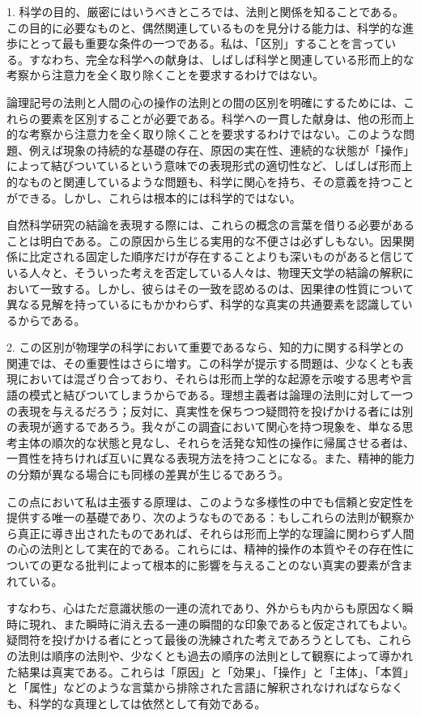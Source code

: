 \documentclass[a4paper,11pt,openany]{ltjsbook}
\begin{document}
1. 科学の目的、厳密にはいうべきところでは、法則と関係を知ることである。この目的に必要なものと、偶然関連しているものを見分ける能力は、科学的な進歩にとって最も重要な条件の一つである。私は、「区別」することを言っている。すなわち、完全な科学への献身は、しばしば科学と関連している形而上的な考察から注意力を全く取り除くことを要求するわけではない。

論理記号の法則と人間の心の操作の法則との間の区別を明確にするためには、これらの要素を区別することが必要である。科学への一貫した献身は、他の形而上的な考察から注意力を全く取り除くことを要求するわけではない。このような問題、例えば現象の持続的な基礎の存在、原因の実在性、連続的な状態が「操作」によって結びついているという意味での表現形式の適切性など、しばしば形而上的なものと関連しているような問題も、科学に関心を持ち、その意義を持つことができる。しかし、これらは根本的には科学的ではない。

自然科学研究の結論を表現する際には、これらの概念の言葉を借りる必要があることは明白である。この原因から生じる実用的な不便さは必ずしもない。因果関係に比定される固定した順序だけが存在することよりも深いものがあると信じている人々と、そういった考えを否定している人々は、物理天文学の結論の解釈において一致する。しかし、彼らはその一致を認めるのは、因果律の性質について異なる見解を持っているにもかかわらず、科学的な真実の共通要素を認識しているからである。

2. この区別が物理学の科学において重要であるなら、知的力に関する科学との関連では、その重要性はさらに増す。この科学が提示する問題は、少なくとも表現においては混ざり合っており、それらは形而上学的な起源を示唆する思考や言語の模式と結びついてしまうからである。理想主義者は論理の法則に対して一つの表現を与えるだろう；反対に、真実性を保ちつつ疑問符を投げかける者には別の表現が適するであろう。我々がこの調査において関心を持つ現象を、単なる思考主体の順次的な状態と見なし、それらを活発な知性の操作に帰属させる者は、一貫性を持ちければ互いに異なる表現方法を持つことになる。また、精神的能力の分類が異なる場合にも同様の差異が生じるであろう。

この点において私は主張する原理は、このような多様性の中でも信頼と安定性を提供する唯一の基礎であり、次のようなものである：もしこれらの法則が観察から真正に導き出されたものであれば、それらは形而上学的な理論に関わらず人間の心の法則として実在的である。これらには、精神的操作の本質やその存在性についての更なる批判によって根本的に影響を与えることのない真実の要素が含まれている。

すなわち、心はただ意識状態の一連の流れであり、外からも内からも原因なく瞬時に現れ、また瞬時に消え去る一連の瞬間的な印象であると仮定されてもよい。疑問符を投げかける者にとって最後の洗練された考えであろうとしても、これらの法則は順序の法則や、少なくとも過去の順序の法則として観察によって導かれた結果は真実である。これらは「原因」と「効果」、「操作」と「主体」、「本質」と「属性」などのような言葉から排除された言語に解釈されなければならなくも、科学的な真理としては依然として有効である。
\end{document}
